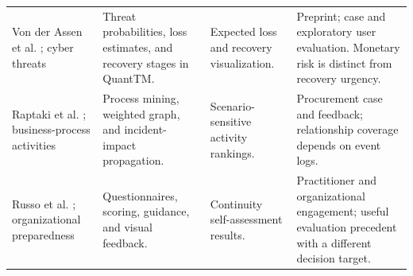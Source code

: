 \begin{landscape}
\begin{longtable}{>{\raggedright\arraybackslash}p{3.5cm}>{\raggedright\arraybackslash}p{6.4cm}>{\raggedright\arraybackslash}p{4.3cm}>{\raggedright\arraybackslash}p{8.0cm}}
Von der Assen et al. \cite{vonderassen2024quanttm}; cyber threats & Threat probabilities, loss estimates, and recovery stages in QuantTM. & Expected loss and recovery visualization. & Preprint; case and exploratory user evaluation. Monetary risk is distinct from recovery urgency. \\
Raptaki et al. \cite{raptaki2025propagation}; business-process activities & Process mining, weighted graph, and incident-impact propagation. & Scenario-sensitive activity rankings. & Procurement case and feedback; relationship coverage depends on event logs. \\
Russo et al. \cite{selfassessment2025}; organizational preparedness & Questionnaires, scoring, guidance, and visual feedback. & Continuity self-assessment results. & Practitioner and organizational engagement; useful evaluation precedent with a different decision target. \\
\end{longtable}
\end{landscape}
\endgroup
